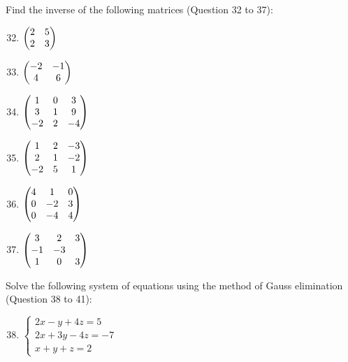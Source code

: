 \documentclass{report}
\begin{document}
\begin{multicols}{2}
\begin{enumerate}[wide, labelwidth=!, labelindent=0pt]
    \end{enumerate}

    \noindent Find the inverse of the following matrices (Question 32 to 37):

    \begin{enumerate}[wide, labelwidth=!, labelindent=0pt]
        \setcounter{enumi}{31}

        \item $\begin{pmatrix}
                      2 & 5\\
                      2 & 3
                  \end{pmatrix}$

        \item $\begin{pmatrix}
                      -2 & -1 \\
                      4 & 6
                  \end{pmatrix}$

        \item $\begin{pmatrix}
                      1 & 0 & 3\\
                      3 & 1 & 9\\
                      -2 & 2 & -4
                  \end{pmatrix}$

        \item $\begin{pmatrix}
                      1 & 2 & -3\\
                      2 & 1 & -2\\
                      -2 & 5 & 1
                  \end{pmatrix}$

        \item $\begin{pmatrix}
                      4 & 1 & 0\\
                      0 & -2 & 3\\
                      0 & -4 & 4
                  \end{pmatrix}$

        \item $\begin{pmatrix}
                      3 & 2 & 3\\
                      -1 & -3 & \\
                      1 & 0 & 3
                  \end{pmatrix}$

    \end{enumerate}

    \noindent Solve the following system of equations using the method of Gauss elimination (Question 38 to 41):

    \begin{enumerate}[wide, labelwidth=!, labelindent=0pt]
        \setcounter{enumi}{37}

        \item $\begin{cases}
                      2x - y + 4z = 5   \\
                      2x + 3y - 4z = -7 \\
                      x + y + z = 2
                  \end{cases}$


\end{enumerate}
\end{multicols}
\end{document}

